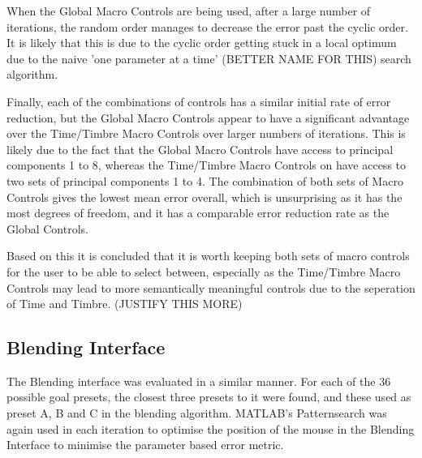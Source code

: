 \documentclass[11pt, oneside]{report}   	%
\begin{document}
When the Global Macro Controls are being used, after a large number of iterations, the random order manages to decrease the error past the cyclic order. It is likely that this is due to the cyclic order getting stuck in a local optimum due to the naive 'one parameter at a time' (BETTER NAME FOR THIS) search algorithm.

Finally, each of the combinations of controls has a similar initial rate of error reduction, but the Global Macro Controls appear to have a significant advantage over the Time/Timbre Macro Controls over larger numbers of iterations. This is likely due to the fact that the Global Macro Controls have access to principal components 1 to 8, whereas the Time/Timbre Macro Controls on have access to two sets of principal components 1 to 4. The combination of both sets of Macro Controls gives the lowest mean error overall, which is unsurprising as it has the most degrees of freedom, and it has a comparable error reduction rate as the Global Controls.

Based on this it is concluded that it is worth keeping both sets of macro controls for the user to be able to select between, especially as the Time/Timbre Macro Controls may lead to more semantically meaningful controls due to the seperation of Time and Timbre. (JUSTIFY THIS MORE)

\subsection{Blending Interface} \label{sec:BlendingEval}
The Blending interface was evaluated in a similar manner. For each of the 36 possible goal presets, the closest three presets to it were found, and these used as preset A, B and C in the blending algorithm. MATLAB's Patternsearch was again used in each iteration to optimise the position of the mouse in the Blending Interface to minimise the parameter based error metric. 
\end{document}
